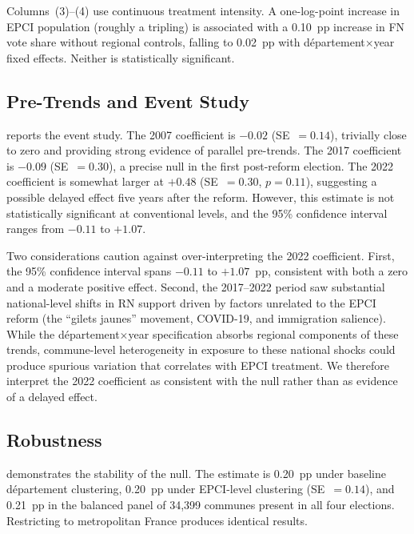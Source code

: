 \documentclass[12pt]{article}
\begin{document}
Columns~(3)--(4) use continuous treatment intensity. A one-log-point increase in EPCI population (roughly a tripling) is associated with a 0.10~pp increase in FN vote share without regional controls, falling to 0.02~pp with d\'{e}partement$\times$year fixed effects. Neither is statistically significant.

\subsection{Pre-Trends and Event Study}



 reports the event study. The 2007 coefficient is $-0.02$ (SE~$= 0.14$), trivially close to zero and providing strong evidence of parallel pre-trends. The 2017 coefficient is $-0.09$ (SE~$= 0.30$), a precise null in the first post-reform election. The 2022 coefficient is somewhat larger at $+0.48$ (SE~$= 0.30$, $p = 0.11$), suggesting a possible delayed effect five years after the reform. However, this estimate is not statistically significant at conventional levels, and the 95\% confidence interval ranges from $-0.11$ to $+1.07$.

Two considerations caution against over-interpreting the 2022 coefficient. First, the 95\% confidence interval spans $-0.11$ to $+1.07$~pp, consistent with both a zero and a moderate positive effect. Second, the 2017--2022 period saw substantial national-level shifts in RN support driven by factors unrelated to the EPCI reform (the ``gilets jaunes'' movement, COVID-19, and immigration salience). While the d\'{e}partement$\times$year specification absorbs regional components of these trends, commune-level heterogeneity in exposure to these national shocks could produce spurious variation that correlates with EPCI treatment. We therefore interpret the 2022 coefficient as consistent with the null rather than as evidence of a delayed effect.

\subsection{Robustness}



 demonstrates the stability of the null. The estimate is 0.20~pp under baseline d\'{e}partement clustering, 0.20~pp under EPCI-level clustering (SE~$= 0.14$), and 0.21~pp in the balanced panel of 34,399 communes present in all four elections. Restricting to metropolitan France produces identical results.
\end{document}

